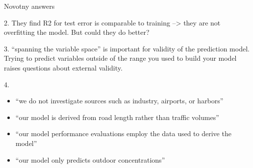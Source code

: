 \documentclass[aspectratio=169, handout]{beamer}
\begin{document}
\begin{frame}{Novotny answers}


2. They find R2 for test error is comparable to training --> they are not overfitting the model.  But could they do better?

3. ``spanning the variable space'' is important for validity of the prediction model.  Trying to predict variables outside of the range you used to build your model raises questions about external validity.

4. 
\begin{itemize}
  \item ``we do not investigate sources such as industry, airports, or harbors''
  \item ``our model is derived from road length rather than traffic volumes''
  \item ``our model performance evaluations employ the data used to derive the model''
  \item ``our model only predicts outdoor concentrations''
\end{itemize}


\end{frame}
\end{document}
